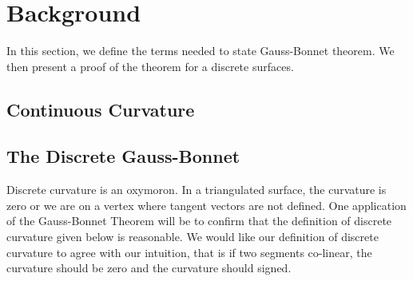 \section{Background}\label{sec:background}
\label{sec:cast}

In this section, we define the terms needed to state Gauss-Bonnet theorem.
We then present a proof of the theorem for a discrete surfaces.


\subsection{Continuous Curvature}




\subsection{The Discrete Gauss-Bonnet}

Discrete curvature is an oxymoron. In a triangulated surface,
the curvature is zero or we are on a vertex where tangent vectors are not defined.
One application of the Gauss-Bonnet Theorem will be to confirm that the definition of discrete curvature 
given below is reasonable.
We would like our definition of discrete curvature to agree with
our intuition, that is if two segments co-linear, the curvature should be zero
and the curvature should signed.



